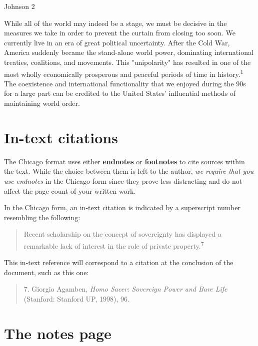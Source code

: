 

\thispagestyle{empty}
\begin{flushright}Johnson 2\end{flushright}
\bigskip
\begin{Spacing}{2}

 While all of the world may indeed be a stage, we must be decisive in the measures we 
take in order to prevent the curtain from closing too soon. We currently live in an era 
of great political uncertainty. After the Cold War, America suddenly became the 
stand-alone world power, dominating international treaties, coalitions, and movements. 
This "unipolarity" has resulted in one of the most wholly economically prosperous and 
peaceful periods of time in history.\textsuperscript{1} The coexistence and international 
functionality that we enjoyed during the 90s for a large part can be credited to the 
United States' influential methods of maintaining world order.
\end{Spacing}
\newpage



\section {In-text citations}
The Chicago format uses either \textbf{endnotes} or \textbf{footnotes} to cite sources 
within the text. While the choice between them is left to the author, 
\emph{we require that you use endnotes} in the Chicago form since they prove less 
distracting and do not affect the page count of your written work. 

In the Chicago form, an in-text citation is indicated by a superscript number resembling 
the following:

\begin{quote}
Recent scholarship on the concept of sovereignty has displayed a remarkable lack of 
interest in the role of private property.\textsuperscript{7}
\end{quote}
This in-text reference will correspond to a citation at the conclusion of the document, 
such as this one:

\begin{quote}
 7. Giorgio Agamben, \emph{Homo Sacer: Sovereign Power and Bare Life} (Stanford: 
Stanford UP, 1998), 96.
\end{quote}


\section{The notes page}

